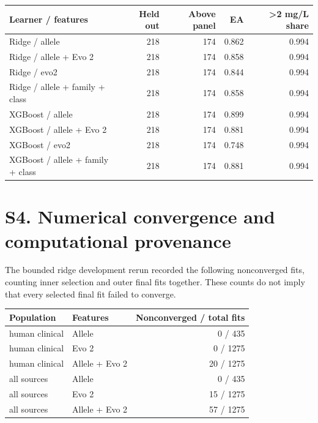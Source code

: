 \documentclass[
  10pt,
]{article}
\newcounter{none} %
\begin{document}
{\def\LTcaptype{none} %
\begin{longtable}[]{@{}lrrrr@{}}
\toprule\noalign{}
Learner / features & Held out & Above panel & EA & \textgreater2 mg/L
share \\
\midrule\noalign{}
\endhead
\bottomrule\noalign{}
\endlastfoot
Ridge / allele & 218 & 174 & 0.862 & 0.994 \\
Ridge / allele + Evo 2 & 218 & 174 & 0.858 & 0.994 \\
Ridge / evo2 & 218 & 174 & 0.844 & 0.994 \\
Ridge / allele + family + class & 218 & 174 & 0.858 & 0.994 \\
XGBoost / allele & 218 & 174 & 0.899 & 0.994 \\
XGBoost / allele + Evo 2 & 218 & 174 & 0.881 & 0.994 \\
XGBoost / evo2 & 218 & 174 & 0.748 & 0.994 \\
XGBoost / allele + family + class & 218 & 174 & 0.881 & 0.994 \\
\end{longtable}
}

\section{S4. Numerical convergence and computational
provenance}\label{s4.-numerical-convergence-and-computational-provenance}

The bounded ridge development rerun recorded the following nonconverged
fits, counting inner selection and outer final fits together. These
counts do not imply that every selected final fit failed to converge.

{\def\LTcaptype{none} %
\begin{longtable}[]{@{}llr@{}}
\toprule\noalign{}
Population & Features & Nonconverged / total fits \\
\midrule\noalign{}
\endhead
\bottomrule\noalign{}
\endlastfoot
human clinical & Allele & 0 / 435 \\
human clinical & Evo 2 & 0 / 1275 \\
human clinical & Allele + Evo 2 & 20 / 1275 \\
all sources & Allele & 0 / 435 \\
all sources & Evo 2 & 15 / 1275 \\
all sources & Allele + Evo 2 & 57 / 1275 \\
\end{longtable}
}
\end{document}
